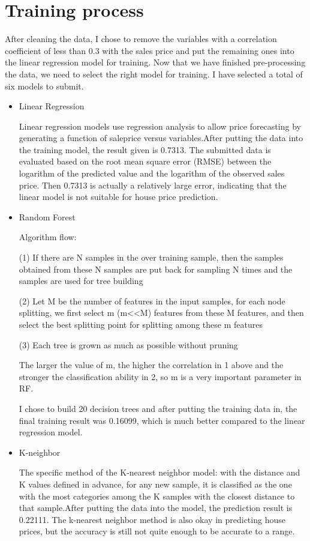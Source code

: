 \documentclass{amsart}
\begin{document}
	\section{Training process}\label{sec-intro}
	After cleaning the data, I chose to remove the variables with a correlation coefficient of less than 0.3 with the sales price and put the remaining ones into the linear regression model for training. Now that we have finished pre-processing the data, we need to select the right model for training. I have selected a total of six models to submit.
	\begin{itemize}
	\item Linear Regression
	\par Linear regression models use regression analysis to allow price forecasting by generating a function of saleprice versus variables.After putting the data into the training model, the result given is 0.7313. The submitted data is evaluated based on the root mean square error (RMSE) between the logarithm of the predicted value and the logarithm of the observed sales price. Then 0.7313 is actually a relatively large error, indicating that the linear model is not suitable for house price prediction.
	\item Random Forest
	\par Algorithm flow:
	\par (1)	If there are N samples in the over training sample, then the samples obtained from these N samples are put back for sampling N times and the samples are used for tree building
	\par (2)	Let M be the number of features in the input samples, for each node splitting, we first select m (m<<M) features from these M features, and then select the best splitting point for splitting among these m features
	\par (3)	Each tree is grown as much as possible without pruning
	\par The larger the value of m, the higher the correlation in 1 above and the stronger the classification ability in 2, so m is a very important parameter in RF.
	\par I chose to build 20 decision trees and after putting the training data in, the final training result was 0.16099, which is much better compared to the linear regression model.
	\item K-neighbor
	\par The specific method of the K-nearest neighbor model: with the distance and K values defined in advance, for any new sample, it is classified as the one with the most categories among the K samples with the closest distance to that sample.After putting the data into the model, the prediction result is 0.22111. The k-nearest neighbor method is also okay in predicting house prices, but the accuracy is still not quite enough to be accurate to a range.

\end{itemize}
\end{document}
